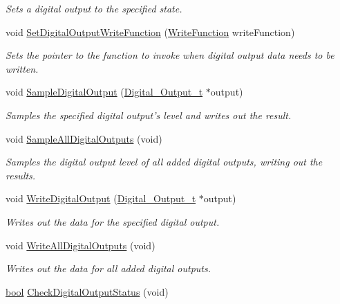 \begin{DoxyCompactItemize}
\begin{DoxyCompactList}\small\item\em Sets a digital output to the specified state. \end{DoxyCompactList}\item 
void \hyperlink{group__digital__output_ga3853c412989dc241c2c9157e5102673b}{Set\-Digital\-Output\-Write\-Function} (\hyperlink{group__tekdaqc__configuration_ga163b2a4cc55a569e988df48908631967}{Write\-Function} write\-Function)
\begin{DoxyCompactList}\small\item\em Sets the pointer to the function to invoke when digital output data needs to be written. \end{DoxyCompactList}\item 
void \hyperlink{group__digital__output_ga51fe681dd6e8e9f84a03b8c71af0b71d}{Sample\-Digital\-Output} (\hyperlink{struct_digital___output__t}{Digital\-\_\-\-Output\-\_\-t} $\ast$output)
\begin{DoxyCompactList}\small\item\em Samples the specified digital output's level and writes out the result. \end{DoxyCompactList}\item 
void \hyperlink{group__digital__output_gacc8cec336fbe7c0aae9dcca1914f7882}{Sample\-All\-Digital\-Outputs} (void)
\begin{DoxyCompactList}\small\item\em Samples the digital output level of all added digital outputs, writing out the results. \end{DoxyCompactList}\item 
void \hyperlink{group__digital__output_gaa10fe33be14ef4d8e16e6345f57938c5}{Write\-Digital\-Output} (\hyperlink{struct_digital___output__t}{Digital\-\_\-\-Output\-\_\-t} $\ast$output)
\begin{DoxyCompactList}\small\item\em Writes out the data for the specified digital output. \end{DoxyCompactList}\item 
void \hyperlink{group__digital__output_ga1198a3ce0740a6ba43f5325d3ba9f950}{Write\-All\-Digital\-Outputs} (void)
\begin{DoxyCompactList}\small\item\em Writes out the data for all added digital outputs. \end{DoxyCompactList}\item 
\hyperlink{group__data__types_ga0ecf26b576b9a54eca656b9be7ba6a06}{bool} \hyperlink{group__digital__output_ga5178a212748e618e157767d96991b0b8}{Check\-Digital\-Output\-Status} (void)

\end{DoxyCompactItemize}
